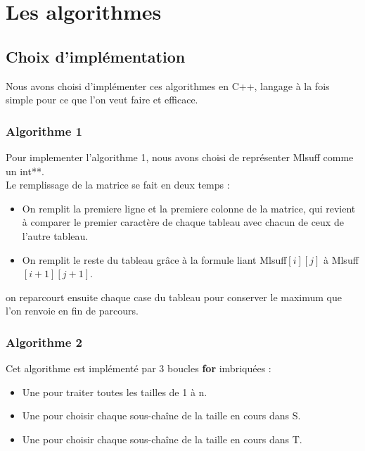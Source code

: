 \chapter{Les algorithmes}
\section{Choix d'implémentation}
  
  Nous avons choisi d'implémenter ces algorithmes en C++, langage à la fois simple pour ce que l'on veut faire et efficace.
  
  \subsection{Algorithme 1}
  Pour implementer l'algorithme 1, nous avons choisi de représenter Mlsuff comme un int**.\\
  
  Le remplissage de la matrice se fait en deux temps : \begin{itemize}
  \item On remplit la premiere ligne et la premiere colonne de la matrice, qui revient à comparer le premier caractère de chaque tableau avec chacun de ceux de l'autre tableau.
  \item On remplit le reste du tableau grâce à la formule liant Mlsuff$[i][j]$ à Mlsuff$[i+1][j+1]$.
  \end{itemize}
  \vspace{0.5cm}
  
  on reparcourt ensuite chaque case du tableau pour conserver le maximum que l'on renvoie en fin de parcours.\\
  
  \subsection{Algorithme 2}
  
	Cet algorithme est implémenté par 3 boucles \textbf{for} imbriquées : \begin{itemize}
\item Une pour traiter toutes les tailles de 1 à n.
\item Une pour choisir chaque sous-chaîne de la taille en cours dans S.
\item Une pour choisir chaque sous-chaîne de la taille en cours dans T.
 \end{itemize}
 \vspace{0.5cm}
 
